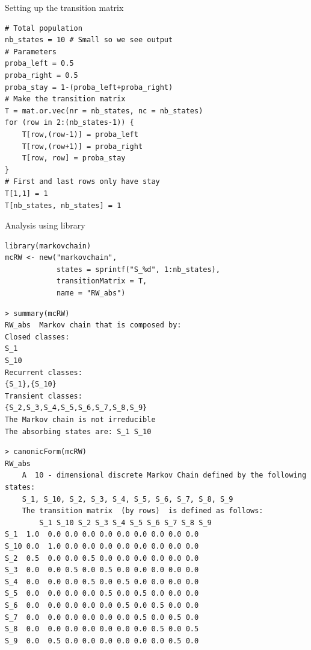 \documentclass[aspectratio=43]{beamer}
\begin{document}
\begin{frame}[fragile]{Setting up the transition matrix}
\begin{lstlisting}[language=Renhanced]
# Total population
nb_states = 10 # Small so we see output
# Parameters
proba_left = 0.5
proba_right = 0.5
proba_stay = 1-(proba_left+proba_right)
# Make the transition matrix
T = mat.or.vec(nr = nb_states, nc = nb_states)
for (row in 2:(nb_states-1)) {
    T[row,(row-1)] = proba_left
    T[row,(row+1)] = proba_right
    T[row, row] = proba_stay
}
# First and last rows only have stay
T[1,1] = 1
T[nb_states, nb_states] = 1    
\end{lstlisting}
\end{frame}

\begin{frame}[fragile]{Analysis using  library}
\begin{lstlisting}
library(markovchain)
mcRW <- new("markovchain", 
            states = sprintf("S_%d", 1:nb_states),
            transitionMatrix = T,
            name = "RW_abs")
\end{lstlisting}
\vfill
\begin{lstlisting}[language=Renhanced]
> summary(mcRW)
RW_abs  Markov chain that is composed by: 
Closed classes: 
S_1 
S_10 
Recurrent classes: 
{S_1},{S_10}
Transient classes: 
{S_2,S_3,S_4,S_5,S_6,S_7,S_8,S_9}
The Markov chain is not irreducible 
The absorbing states are: S_1 S_10
\end{lstlisting}
\end{frame}

\begin{frame}[fragile]
\begin{lstlisting}
> canonicForm(mcRW)
RW_abs 
    A  10 - dimensional discrete Markov Chain defined by the following states: 
    S_1, S_10, S_2, S_3, S_4, S_5, S_6, S_7, S_8, S_9 
    The transition matrix  (by rows)  is defined as follows: 
        S_1 S_10 S_2 S_3 S_4 S_5 S_6 S_7 S_8 S_9
S_1  1.0  0.0 0.0 0.0 0.0 0.0 0.0 0.0 0.0 0.0
S_10 0.0  1.0 0.0 0.0 0.0 0.0 0.0 0.0 0.0 0.0
S_2  0.5  0.0 0.0 0.5 0.0 0.0 0.0 0.0 0.0 0.0
S_3  0.0  0.0 0.5 0.0 0.5 0.0 0.0 0.0 0.0 0.0
S_4  0.0  0.0 0.0 0.5 0.0 0.5 0.0 0.0 0.0 0.0
S_5  0.0  0.0 0.0 0.0 0.5 0.0 0.5 0.0 0.0 0.0
S_6  0.0  0.0 0.0 0.0 0.0 0.5 0.0 0.5 0.0 0.0
S_7  0.0  0.0 0.0 0.0 0.0 0.0 0.5 0.0 0.5 0.0
S_8  0.0  0.0 0.0 0.0 0.0 0.0 0.0 0.5 0.0 0.5
S_9  0.0  0.5 0.0 0.0 0.0 0.0 0.0 0.0 0.5 0.0
\end{lstlisting}
\end{frame}
\end{document}
